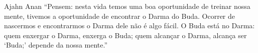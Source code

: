 
\begin{quotepage}{0.65\linewidth}{Ajahn Anan}
“Pensem: nesta vida temos uma boa oportunidade de treinar nossa mente,
tivemos a oportunidade de encontrar o Darma do Buda. Ocorrer de
nascermos e encontrarmos o Darma dele não é algo fácil. O Buda está no
Darma: quem enxergar o Darma, enxerga o Buda; quem alcançar o Darma,
alcança ser ‘Buda;’ depende da nossa mente.”
\end{quotepage}

